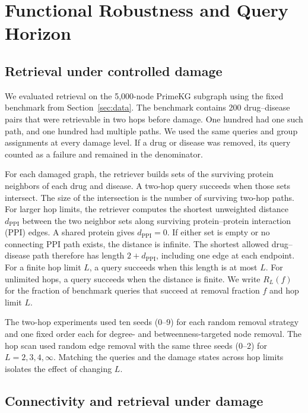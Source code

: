 \section{Functional Robustness and Query Horizon}
\label{sec:functional}

\subsection{Retrieval under controlled damage}
\label{retrieval-under-controlled-damage}

We evaluated retrieval on the 5,000-node PrimeKG subgraph using the fixed
benchmark from Section~\ref{sec:data}. The benchmark contains 200
drug--disease pairs that were retrievable in two hops before damage. One hundred had one such path, and one hundred had multiple paths. We used the same
queries and group assignments at every damage level. If a drug or
disease was removed, its query counted as a failure and remained in
the denominator.

For each damaged graph, the retriever builds sets of the surviving
protein neighbors of each drug and disease. A two-hop query succeeds
when those sets intersect. The size of the intersection is the number
of surviving two-hop paths. For larger hop limits, the retriever
computes the shortest unweighted distance $d_{\mathrm{PPI}}$ between
the two neighbor sets along surviving protein--protein interaction
(PPI) edges. A shared protein gives $d_{\mathrm{PPI}}=0$. If either set
is empty or no connecting PPI path exists, the distance is infinite.
The shortest allowed drug--disease path therefore has length
$2+d_{\mathrm{PPI}}$, including one edge at each endpoint. For a
finite hop limit $L$, a query succeeds when this length is at most
$L$. For unlimited hops, a query succeeds when the distance is finite.
We write $R_L(f)$ for the fraction of benchmark queries that succeed
at removal fraction $f$ and hop limit $L$.

The two-hop experiments used ten seeds (0--9) for each random removal
strategy and one fixed order each for degree- and betweenness-targeted
node removal. The hop scan used random edge removal with the same
three seeds (0--2) for $L=2,3,4,\infty$. Matching the queries and the
damage states across hop limits isolates the effect of changing $L$.

\subsection{Connectivity and retrieval under damage}
\label{connectivity-and-retrieval-separate}

